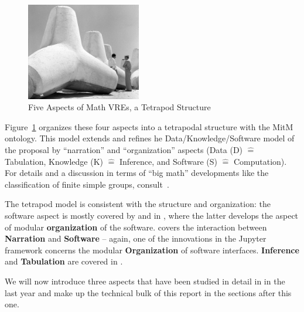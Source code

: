 \begin{figure}[ht]\centering
\includegraphics[width=5cm]{tetrapod}\qquad

\caption{Five Aspects of Math VREs, a Tetrapod Structure}\label{fig:tetrapod}
\end{figure}

\def\hateq{\ensuremath{\widehat=}\xspace} Figure~\ref{fig:tetrapod} organizes these four aspects into a tetrapodal structure with the MitM ontology.  This model extends and refines he Data/Knowledge/Software model of the proposal by ``narration'' and ``organization'' aspects (Data (D) \hateq Tabulation, Knowledge (K) \hateq Inference, and Software (S) \hateq Computation). For details and a discussion in terms of ``big math'' developments like the classification of finite simple groups, consult~\cite{CarFarKohRab:bmobb19}.

The tetrapod model is consistent with the \pn structure and organization: the software aspect is mostly covered by  and  in \pn, where the latter develops the aspect of modular \textbf{organization} of the software.  covers the interaction between \textbf{Narration} and \textbf{Software} -- again, one of the innovations in the Jupyter framework concerns the modular \textbf{Organization} of software interfaces. \textbf{Inference} and \textbf{Tabulation} are covered in .

We will now introduce three aspects that have been studied in detail in \pn in the last year and make up the technical bulk of this report in the sections after this one.  


